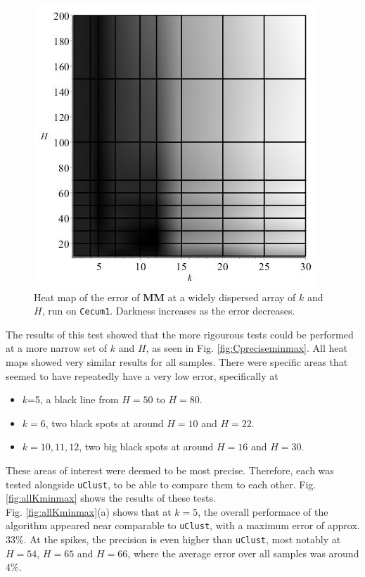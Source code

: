 \documentclass[../../main.tex]{subfiles}
\begin{document}
\begin{figure}[H]
\includegraphics[scale=0.5]{precision/minmax/cecum1wide.jpg}
\caption{Heat map of the error of {\bf MM} at a widely dispersed array of $k$ and $H$, run on \texttt{Cecum1}. Darkness increases as the error decreases.}\label{fig:wideCminmax}
\end{figure}

The results of this test showed that the more rigourous tests could be performed at a more narrow set of $k$ and $H$, as seen in Fig. \ref{fig:Cpreciseminmax}. All heat maps showed very similar results for all samples. There were specific areas that seemed to have repeatedly have a very low error, specifically at
\begin{itemize}
\item $k$=5, a black line from $H=50$ to $H=80$.
\item $k=6$, two black spots at around $H=10$ and $H=22$.
\item $k=10,11,12$, two big black spots at around $H=16$ and $H=30$. 
\end{itemize}
These areas of interest were deemed to be most precise. Therefore, each was tested alongside \texttt{uClust}, to be able to compare them to each other. Fig. \ref{fig:allKminmax} shows the results of these tests.\\

Fig. \ref{fig:allKminmax}(a) shows that at $k=5$, the overall performace of the algorithm appeared near comparable to \texttt{uClust}, with a maximum error of approx. 33\%. At the spikes, the precision is even higher than \texttt{uClust}, most notably at $H=54$, $H=65$ and $H=66$, where the average error over all samples was around 4\%. 
\end{document}
